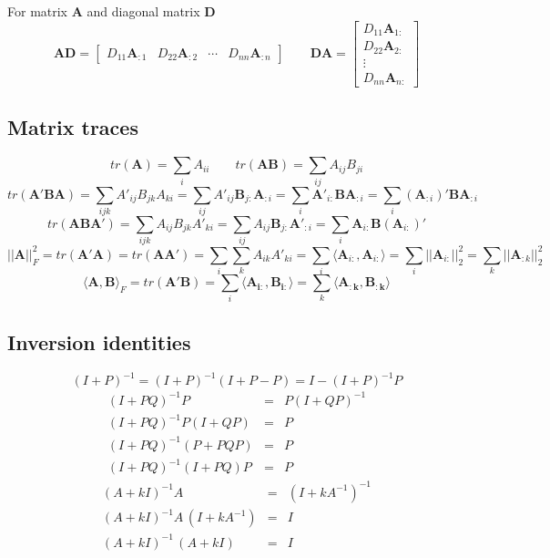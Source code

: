 \documentclass[a4paper]{article}
\newcommand{\vc}[1]{\mathbf{#1}}
\numberwithin{equation}{section}
\begin{document}
For matrix $\vc{A}$ and diagonal matrix $\vc{D}$
\begin{equation}
 \vc{AD} = 
\begin{bmatrix}
 D_{11} \vc{A}_{:1} &
 D_{22} \vc{A}_{:2} &
 \cdots &
 D_{nn} \vc{A}_{:n}
\end{bmatrix}
\qquad
 \vc{DA} = 
\begin{bmatrix}
 D_{11} \vc{A}_{1:} \\
 D_{22} \vc{A}_{2:} \\
 \vdots \\
 D_{nn} \vc{A}_{n:}
\end{bmatrix}
\end{equation}


\subsection{Matrix traces}

\begin{equation}
 tr(\vc{A}) = \sum_i A_{ii} \qquad tr(\vc{AB}) = \sum_{ij} A_{ij} B_{ji}
\end{equation} 
\begin{equation}
 tr(\vc{A'BA}) = \sum_{ijk} A'_{ij} B_{jk} A_{ki} = \sum_{ij} A'_{ij} \vc{B}_{j:} \vc{A}_{:i} = \sum_{i} \vc{A}'_{i:} \vc{B} \vc{A}_{:i} = \sum_{i} (\vc{A}_{:i})' \vc{B} \vc{A}_{:i}
\end{equation}
\begin{equation}
 tr(\vc{ABA'}) = \sum_{ijk} A_{ij} B_{jk} A'_{ki} = \sum_{ij} A_{ij} \vc{B}_{j:} \vc{A'}_{:i} = \sum_{i} \vc{A}_{i:} \vc{B} (\vc{A}_{i:})'
\end{equation}
\begin{equation}
 ||\vc{A}||_F^2 = tr(\vc{A'A}) = tr(\vc{AA'}) = \sum_i \sum_k A_{ik} A'_{ki} = \sum_i
\langle \vc{A}_{i:}, \vc{A}_{i:} \rangle = \sum_i ||\vc{A}_{i:}||_2^2 = \sum_k
||\vc{A}_{:k}||_2^2
\end{equation}
\begin{equation}
 \langle \vc{A},\vc{B} \rangle_F = tr(\vc{A'B}) = \sum_i \langle \vc{A_{i:}},\vc{B_{i:}}
\rangle = \sum_k \langle \vc{A_{:k}},\vc{B_{:k}} \rangle
\end{equation}


\subsection{Inversion identities}
\begin{equation}
(I+P)^{-1} = (I+P)^{-1} (I + P - P) = I - (I+P)^{-1} P
\end{equation}
\begin{eqnarray}
(I + PQ)^{-1} P & = & P (I + QP)^{-1} \\
(I + PQ)^{-1} P (I + QP) & = & P \nonumber \\
(I + PQ)^{-1} (P + PQP) & = & P \nonumber \\
(I + PQ)^{-1} (I + PQ) P & = & P \nonumber
\end{eqnarray}
\begin{eqnarray}
(A + kI)^{-1} A & = & (I + kA^{-1})^{-1} \\
(A + kI)^{-1} A \, (I + kA^{-1}) & = & I \nonumber \\
(A + kI)^{-1} \, (A + kI) & = & I \nonumber 
\end{eqnarray}
\end{document}
